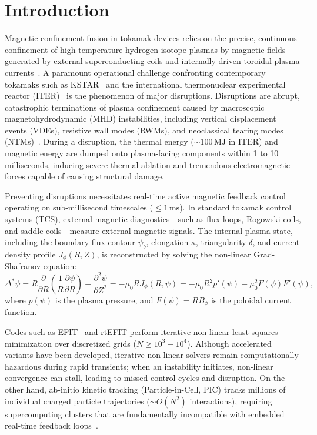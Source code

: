 \documentclass[11pt,a4paper]{article}
\begin{document}
\section{Introduction}
Magnetic confinement fusion in tokamak devices relies on the precise, continuous confinement of high-temperature hydrogen isotope plasmas by magnetic fields generated by external superconducting coils and internally driven toroidal plasma currents~\cite{wesson2011tokamaks}. A paramount operational challenge confronting contemporary tokamaks such as KSTAR~\cite{kstar2020} and the international thermonuclear experimental reactor (ITER)~\cite{iter2019} is the phenomenon of major disruptions. Disruptions are abrupt, catastrophic terminations of plasma confinement caused by macroscopic magnetohydrodynamic (MHD) instabilities, including vertical displacement events (VDEs), resistive wall modes (RWMs), and neoclassical tearing modes (NTMs)~\cite{hender2007disruptions}. During a disruption, the thermal energy ($\sim 100\,\mathrm{MJ}$ in ITER) and magnetic energy are dumped onto plasma-facing components within 1 to 10 milliseconds, inducing severe thermal ablation and tremendous electromagnetic forces capable of causing structural damage.

Preventing disruptions necessitates real-time active magnetic feedback control operating on sub-millisecond timescales ($\le 1\,\mathrm{ms}$). In standard tokamak control systems (TCS), external magnetic diagnostics---such as flux loops, Rogowski coils, and saddle coils---measure external magnetic signals. The internal plasma state, including the boundary flux contour $\psi_b$, elongation $\kappa$, triangularity $\delta$, and current density profile $J_\phi(R,Z)$, is reconstructed by solving the non-linear Grad-Shafranov equation:
\begin{equation}
    \Delta^* \psi = R \frac{\partial}{\partial R}\left( \frac{1}{R}\frac{\partial \psi}{\partial R} \right) + \frac{\partial^2 \psi}{\partial Z^2} = -\mu_0 R J_\phi(R, \psi) = -\mu_0 R^2 p'(\psi) - \mu_0^2 F(\psi)F'(\psi),
    \label{eq:grad_shafranov}
\end{equation}
where $p(\psi)$ is the plasma pressure, and $F(\psi) = R B_\phi$ is the poloidal current function.

Codes such as EFIT~\cite{lao1985reconstruction} and rtEFIT perform iterative non-linear least-squares minimization over discretized grids ($N \ge 10^3 - 10^4$). Although accelerated variants have been developed, iterative non-linear solvers remain computationally hazardous during rapid transients; when an instability initiates, non-linear convergence can stall, leading to missed control cycles and disruption. On the other hand, ab-initio kinetic tracking (Particle-in-Cell, PIC) tracks millions of individual charged particle trajectories ($\sim O(N^2)$ interactions), requiring supercomputing clusters that are fundamentally incompatible with embedded real-time feedback loops~\cite{birdsall2018plasma}.
\end{document}
